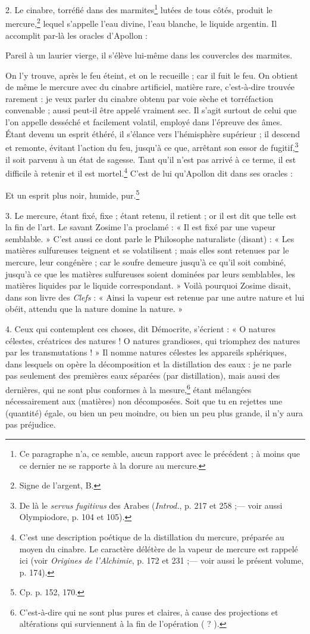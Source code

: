 \documentclass[a4paper, 11pt, oneside, polutonikogreek, french]{article}
\begin{document}
2. Le cinabre, torréfié dans des marmites\footnote{Ce paragraphe n'a, ce semble, aucun rapport avec le précédent ; à moins que ce dernier ne se rapporte à la dorure au mercure.} lutées de tous côtés, produit le mercure,\footnote{Signe de l'argent, B.} lequel s'appelle l'eau divine, l'eau blanche, le liquide argentin. Il accomplit par-là les oracles d'Apollon :

Pareil à un laurier vierge, il s'élève lui-même dans les couvercles des marmites.

On l'y trouve, après le feu éteint, et on le recueille ; car il fuit le feu. On obtient de même le mercure avec du cinabre artificiel, matière rare, c'est-à-dire trouvée rarement : je veux parler du cinabre obtenu par voie sèche et torréfaction convenable ; aussi peut-il être appelé vraiment sec. Il s'agit surtout de celui que l'on appelle desséché et facilement volatil, employé dans l'épreuve des âmes. Étant devenu un esprit éthéré, il s'élance vers l'hémisphère supérieur ; il descend et remonte, évitant l'action du feu, jusqu'à ce que, arrêtant son essor de fugitif,\footnote{De là le \emph{servus fugitivus} des Arabes (\emph{Introd.}, p. 217 et 258 ;--- voir aussi Olympiodore, p. 104 et 105).} il soit parvenu à un état de sagesse. Tant qu'il n'est pas arrivé à ce terme, il est difficile à retenir et il est mortel.\footnote{C'est une description poétique de la distillation du mercure, préparée au moyen du cinabre. Le caractère délétère de la vapeur de mercure est rappelé ici (voir \emph{Origines de l'Alchimie}, p. 172 et 231 ;--- voir aussi le présent volume, p. 174).} C'est de lui qu'Apollon dit dans ses oracles :

Et un esprit plus noir, humide, pur.\footnote{Cp. p. 152, 170.}

3. Le mercure, étant fixé, fixe ; étant retenu, il retient ; or il est dit que telle est la fin de l'art. Le savant Zosime l'a proclamé : « Il est fixé par une vapeur semblable. » C'est aussi ce dont parle le Philosophe naturaliste (disant) : « Les matières sulfureuses teignent et se volatilisent ; mais elles sont retenues par le mercure, leur congénère ; car le soufre demeure jusqu'à ce qu'il soit combiné, jusqu'à ce que les matières sulfureuses soient dominées par leurs semblables, les matières liquides par le liquide correspondant. » Voilà pourquoi Zosime disait, dans son livre des \emph{Clefs} : « Ainsi la vapeur est retenue par une autre nature et lui obéit, attendu que la nature domine la nature. »

4. Ceux qui contemplent ces choses, dit Démocrite, s'écrient : « O natures célestes, créatrices des natures ! O natures grandioses, qui triomphez des natures par les transmutations ! » Il nomme natures célestes les appareils sphériques, dans lesquels on opère la décomposition et la distillation des eaux : je ne parle pas seulement des premières eaux séparées (par distillation), mais aussi des dernières, qui ne sont plus conformes à la mesure,\footnote{C'est-à-dire qui ne sont plus pures et claires, à cause des projections et altérations qui surviennent à la fin de l'opération ( ? ).} étant mélangées nécessairement aux (matières) non décomposées. Soit que tu en rejettes une (quantité) égale, ou bien un peu moindre, ou bien un peu plus grande, il n'y aura pas préjudice.
\end{document}
